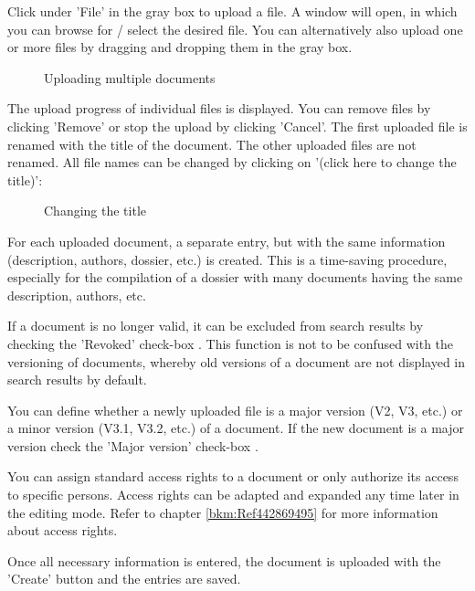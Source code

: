 Click under 'File'  in the gray box to upload a file. A window will open, in which you can browse for / select the desired file. You can alternatively also upload one or more files by dragging and dropping them in the gray box.

\begin{figure}[H]
\caption{Uploading multiple documents}
\end{figure}

The upload progress of individual files is displayed. You can remove files by clicking 'Remove' or stop the upload by clicking 'Cancel'. The first uploaded file is renamed with the title of the document. The other uploaded files are not renamed. All file names can be changed by clicking on '(click here to change the title)':

\begin{figure}[H]
\caption{Changing the title}
\end{figure}

For each uploaded document, a separate entry, but with the same information (description, authors, dossier, etc.) is created. This is a time-saving procedure, especially for the compilation of a dossier with many documents having the same description, authors, etc. \newline

If a document is no longer valid, it can be excluded from search results by checking the 'Revoked' check-box . This function is not to be confused with the versioning of documents, whereby old versions of a document are not displayed in search results by default. \newline

You can define whether a newly uploaded file is a major version (V2, V3, etc.) or a minor version (V3.1, V3.2, etc.) of a document. If the new document is a major version check the 'Major version' check-box . \newline

You can assign standard access rights to a document  or only authorize its access to specific persons. Access rights can be adapted and expanded any time later in the editing mode. Refer to chapter \ref{bkm:Ref442869495} for more information about access rights.

Once all necessary information is entered, the document is uploaded with the 'Create' button  and the entries are saved. \newline

